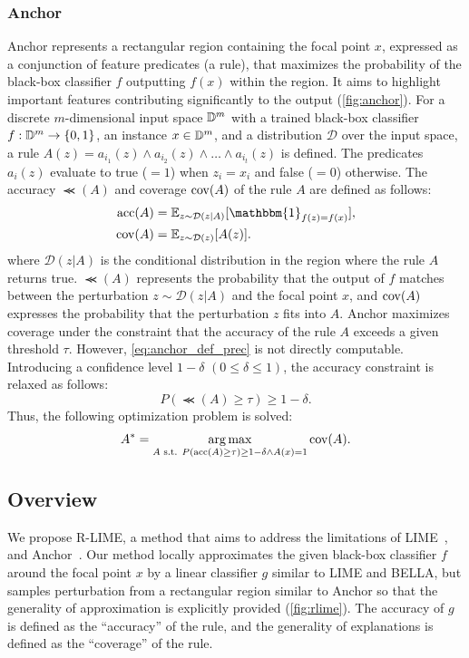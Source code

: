 \documentclass[11pt]{article}
\begin{document}
\subsubsection[Anchor]{%
  Anchor~\cite{ribeiro2018anchors}
}\label{sec:anchor}
Anchor represents a rectangular region containing the focal point $x$,
expressed as a conjunction of feature predicates (a rule),
that maximizes the probability of the black-box classifier $f$
outputting $f(x)$ within the region.
It aims to highlight important features
contributing significantly to the output (\cref{fig:anchor}).
For a discrete $m$-dimensional input space $\mathbb{D}^{m}$
with a trained black-box classifier $f: \mathbb{D}^{m} \to \{0,1\}$,
an instance $x \in \mathbb{D}^{m}$,
and a distribution $\mathcal{D}$ over the input space,
a rule $A(z) = a_{i_1}(z) \wedge a_{i_2}(z) \wedge \dots \wedge a_{i_t}(z)$ is defined.
The predicates $a_i(z)$ evaluate to true ($=1$) when $z_i = x_i$ and false ($=0$) otherwise.
The accuracy $\Prec(A)$ and coverage $\operatorname{cov}(A)$ of the rule $A$ are defined as follows:
\begin{align}
  \Prec(A) & =\mathbb{E}_{z\sim\mathcal{D}(z|A)}
  [\mathbbm{1}_{f(z)=f(x)}], \label{eq:anchor_def_prec} \\
  \Cov(A)  & =\mathbb{E}_{z\sim\mathcal{D}(z)}[A(z)].
\end{align}
where $\mathcal{D}(z|A)$ is the conditional distribution in the region
where the rule $A$ returns true.
$\Prec(A)$ represents the probability that the output of $f$ matches
between the perturbation $z\sim\mathcal{D}(z|A)$ and the focal point $x$,
and $\operatorname{cov}(A)$ expresses the probability that the perturbation $z$ fits into $A$.
Anchor maximizes coverage under the constraint that
the accuracy of the rule $A$ exceeds a given threshold $\tau$.
However, \cref{eq:anchor_def_prec} is not directly computable.
Introducing a confidence level $1-\delta$ $(0\le\delta\le1)$,
the accuracy constraint is relaxed as follows:
\begin{equation}
  \label{eq:const_prec}
  P(\Prec(A)\ge\tau)\ge1-\delta.
\end{equation}
Thus, the following optimization problem is solved:
\begin{equation}
  \label{eq:main_problem}
  A^*=\underset{A \text{~s.t. } P(\operatorname{acc}(A)\ge\tau)\ge1-\delta\wedge A(x)=1}
  {\arg\max}\operatorname{cov}(A).
\end{equation}

\subsection{Overview}
We propose R-LIME,
a method that aims to address the limitations of LIME~\cite{ribeiro2016why},
and Anchor~\cite{ribeiro2018anchors}.
Our method locally approximates the given black-box classifier $f$
around the focal point $x$ by a linear classifier $g$ similar to LIME and BELLA,
but samples perturbation from a rectangular region similar to Anchor
so that the generality of approximation is explicitly provided
(\cref{fig:rlime}).
The accuracy of $g$ is defined as the ``accuracy'' of the rule,
and the generality of explanations is defined as the ``coverage'' of the rule.
\end{document}

